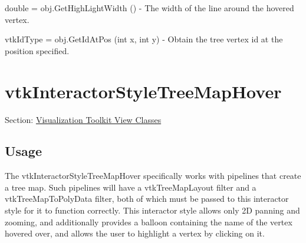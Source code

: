 \begin{DoxyItemize}
\item {\ttfamily double = obj.\-Get\-High\-Light\-Width ()} -\/ The width of the line around the hovered vertex.  
\item {\ttfamily vtk\-Id\-Type = obj.\-Get\-Id\-At\-Pos (int x, int y)} -\/ Obtain the tree vertex id at the position specified.  
\end{DoxyItemize}\hypertarget{vtkviews_vtkinteractorstyletreemaphover}{}\section{vtk\-Interactor\-Style\-Tree\-Map\-Hover}\label{vtkviews_vtkinteractorstyletreemaphover}
Section\-: \hyperlink{sec_vtkviews}{Visualization Toolkit View Classes} \hypertarget{vtkwidgets_vtkxyplotwidget_Usage}{}\subsection{Usage}\label{vtkwidgets_vtkxyplotwidget_Usage}
The vtk\-Interactor\-Style\-Tree\-Map\-Hover specifically works with pipelines that create a tree map. Such pipelines will have a vtk\-Tree\-Map\-Layout filter and a vtk\-Tree\-Map\-To\-Poly\-Data filter, both of which must be passed to this interactor style for it to function correctly. This interactor style allows only 2\-D panning and zooming, and additionally provides a balloon containing the name of the vertex hovered over, and allows the user to highlight a vertex by clicking on it.

